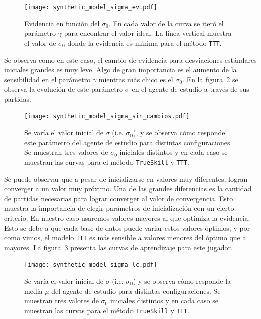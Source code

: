 \documentclass[11pt,twoside,spanish]{report} %
\begin{document}
\begin{figure}[H]
	\centering
	\texttt{[image: synthetic\_model\_sigma\_ev.pdf]}
	\caption{Evidencia en funci\'on del  $\sigma_0$. En cada valor de la curva se iter\'o el par\'ametro $\gamma$ para encontrar el valor ideal. La l\'inea vertical muestra el valor de $\sigma_0$ donde la evidencia es m\'inima para el m\'etodo \texttt{TTT}.}
	\label{fig:sigma_ev}
\end{figure}

Se observa como en este caso, el cambio de evidencia para desviaciones est\'andares iniciales grandes es muy leve.
Algo de gran importancia es el aumento de la sensibilidad en el par\'ametro $\gamma$ mientras m\'as chico es el $\sigma_0$.
En la figura~\ref{fig:sigma}  se observa la evoluci\'on de este par\'ametro $\sigma$ en el agente de estudio a trav\'es de sus partidas.


\begin{figure}[H]
	\centering
	\texttt{[image: synthetic\_model\_sigma\_sin\_cambios.pdf]}
    \caption{Se var\'ia el valor inicial de $\sigma$ (i.e. $\sigma_0$), y se observa c\'omo responde este par\'ametro del agente de estudio para distintas configuraciones. Se muestran tres valores de $\sigma_0$ iniciales distintos y en cada caso se muestran las curvas para el m\'etodo \texttt{TrueSkill} y \texttt{TTT}.}
	\label{fig:sigma}
\end{figure}


Se puede observar que a pesar de inicializarse en valores muy diferentes, logran converger a un valor muy pr\'oximo.
Una de las grandes diferencias es la cantidad de partidas necesarias para lograr converger al valor de convergencia.
Esto muestra la importancia de elegir par\'ametros de inicializaci\'on con un cierto criterio.
En nuestro caso usaremos valores mayores al que optimiza la evidencia.
Esto se debe a que cada base de datos puede variar estos valores \'optimos, y por como vimos, el modelo \texttt{TTT} es m\'as sensible a valores menores del \'optimo que a mayores.
La figura~\ref{fig:sigma_lc} presenta las curvas de aprendizaje para este jugador.

\begin{figure}[H]
	\centering
	\texttt{[image: synthetic\_model\_sigma\_lc.pdf]}
	\caption{Se var\'ia el valor inicial de $\sigma$ (i.e. $\sigma_0$) y se observa c\'omo responde la media $\mu$ del agente de estudio para distintas configuraciones. Se muestran tres valores de $\sigma_0$ iniciales distintos y en cada caso se muestran las curvas para el m\'etodo \texttt{TrueSkill} y \texttt{TTT}.}
	\label{fig:sigma_lc}
\end{figure}
\end{document}
